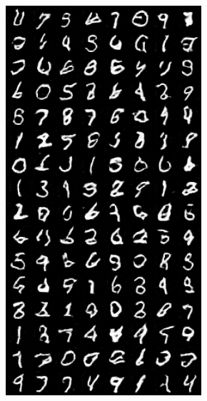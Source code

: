 \begin{figure}[H]
\begin{subfigure}{0.2\textwidth}
        \includegraphics[width=0.95\linewidth]{nz/nz500_fake_sample_epoch_0010.png}
        \caption{}
        \label{subfig:nz500}
    \end{subfigure}%
    \begin{subfigure}{0.2\textwidth}
        \centering

\end{subfigure}
\end{figure}
